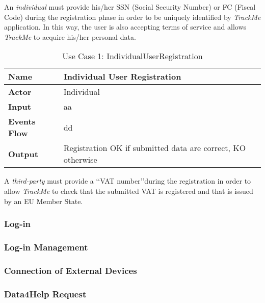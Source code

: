 \documentclass[a4paper]{article}
\begin{document}
        An \textit{individual} must provide his/her SSN (Social Security Number) or FC (Fiscal Code) during the registration phase in order to be uniquely identified by \textit{TrackMe} application. In this way, the user is also accepting terms of service and allows \textit{TrackMe} to acquire his/her personal data.
        \begin{table}[!h]
            \begin{tabular}{|p{3cm}|p{6cm}|}
                \hline
                \textbf{Name} & Individual User Registration \\
                \hline
                \textbf{Actor} & Individual \\
                \hline
                \textbf{Input} & aa \\
                \hline
                \textbf{Events Flow} & dd \\
                \hline
                \textbf{Output} & Registration OK if submitted data are correct, KO otherwise \\
                \hline
            \end{tabular}
            \centering
            \caption{\fontsize{10px}{0mm}\selectfont Use Case 1: IndividualUserRegistration\label{IndividualUserRegistration}}
        \end{table}
        
        A \textit{third-party} must provide a \lq\lq VAT number\rq\rq during the registration in order to allow \textit{TrackMe} to check that the submitted VAT is registered and that is issued by an EU Member State.
        \subsubsection{Log-in}
         
        \subsubsection{Log-in Management}
        
        \subsubsection{Connection of External Devices}
        
        \subsubsection{Data4Help Request}
        
\end{document}
